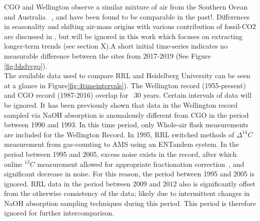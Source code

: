 \indent CGO and Wellington observe a similar mixture of air from the Southern Ocean and Australia ~\cite{ziehn2014}, and have been found to be comparable in the past!\cite{turnbull2017}. Differences in seasonality and shifting air-mass origins with various contribution of fossil-CO2 are discussed in \cite{turnbull2017}, but will be ignored in this work which focuses on extracting longer-term trends (see section X).A short initial time-series indicates no measurable difference between the sites from 2017-2019 (See Figure \ref{fig:bhdvcgo}). \\

\indent The available data used to compare RRL and Heidelberg University can be seen at a glance in Figure\ref{fig:4timeintervals}). The Wellington record (1955-present) and CGO record (1987-2016) overlap for ~30 years.  
Certain intervals of data will be ignored.  
\indent It has been previously shown that data in the Wellington record sampled via NaOH absorption is anomalously different from CGO in the period between 1990 and 1993\cite{turnbull2017, levin2010}. In this time period, only Whole-air flask measurements are included for the Wellington Record.
\indent In 1995, RRL switched methods of ${\Delta^{14}C}$ measurement from gas-counting to AMS using an ENTandem system. In the period between 1995 and 2005, excess noise exists in the record, after which online $^{13}C$ measurement allowed for appropriate fractionation correction~\cite{turnbull2017, ZONDERVAN201525}, and significant decrease in noise. For this reason, the period between 1995 and 2005 is ignored. 
\indent RRL data in the period between 2009 and 2012 also is significantly offset from the otherwise consistency of the data; likely due to intermittent changes in NaOH absorption sampling techniques during this period. This period is therefore ignored for further intercomparison. 

